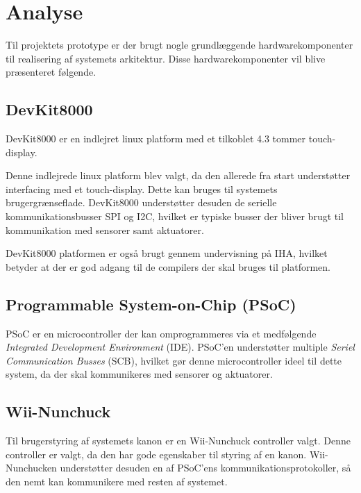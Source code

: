 \chapter{Analyse}
\label{afsnit:analyse}
Til projektets prototype er der brugt nogle grundlæggende hardwarekomponenter til realisering af systemets arkitektur. Disse hardwarekomponenter vil blive præsenteret følgende.

\section{DevKit8000}
DevKit8000 er en indlejret linux platform med et tilkoblet 4.3 tommer touch-display.

Denne indlejrede linux platform blev valgt, da den allerede fra start understøtter interfacing med et touch-display. Dette kan bruges til systemets brugergrænseflade. DevKit8000 understøtter desuden de serielle kommunikationsbusser SPI og I2C, hvilket er typiske busser der bliver brugt til kommunikation med sensorer samt aktuatorer. 

DevKit8000 platformen er også brugt gennem undervisning på IHA, hvilket betyder at der er god adgang til de compilers der skal bruges til platformen.

\section{Programmable System-on-Chip (PSoC)}
PSoC er en microcontroller der kan omprogrammeres via et medfølgende \textit{Integrated Development Environment} (IDE). PSoC'en understøtter multiple \textit{Seriel Communication Busses} (SCB), hvilket gør denne microcontroller ideel til dette system, da der skal kommunikeres med sensorer og aktuatorer.

\section{Wii-Nunchuck}
Til brugerstyring af systemets kanon er en Wii-Nunchuck controller valgt. Denne controller er valgt, da den har gode egenskaber til styring af en kanon. Wii-Nunchucken understøtter desuden en af PSoC'ens kommunikationsprotokoller, så den nemt kan kommunikere med resten af systemet.
